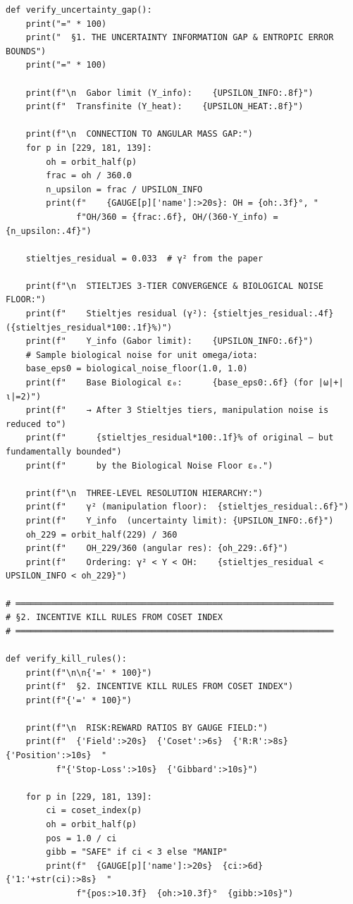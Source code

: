 \begin{verbatim}
def verify_uncertainty_gap():
    print("=" * 100)
    print("  §1. THE UNCERTAINTY INFORMATION GAP & ENTROPIC ERROR BOUNDS")
    print("=" * 100)

    print(f"\n  Gabor limit (Υ_info):    {UPSILON_INFO:.8f}")
    print(f"  Transfinite (Υ_heat):    {UPSILON_HEAT:.8f}")

    print(f"\n  CONNECTION TO ANGULAR MASS GAP:")
    for p in [229, 181, 139]:
        oh = orbit_half(p)
        frac = oh / 360.0
        n_upsilon = frac / UPSILON_INFO
        print(f"    {GAUGE[p]['name']:>20s}: OH = {oh:.3f}°, "
              f"OH/360 = {frac:.6f}, OH/(360·Υ_info) = {n_upsilon:.4f}")
    
    stieltjes_residual = 0.033  # γ² from the paper

    print(f"\n  STIELTJES 3-TIER CONVERGENCE & BIOLOGICAL NOISE FLOOR:")
    print(f"    Stieltjes residual (γ²): {stieltjes_residual:.4f} ({stieltjes_residual*100:.1f}%)")
    print(f"    Υ_info (Gabor limit):    {UPSILON_INFO:.6f}")
    # Sample biological noise for unit omega/iota:
    base_eps0 = biological_noise_floor(1.0, 1.0)
    print(f"    Base Biological ε₀:      {base_eps0:.6f} (for |ω|+|ι|=2)")
    print(f"    → After 3 Stieltjes tiers, manipulation noise is reduced to")
    print(f"      {stieltjes_residual*100:.1f}% of original — but fundamentally bounded")
    print(f"      by the Biological Noise Floor ε₀.")

    print(f"\n  THREE-LEVEL RESOLUTION HIERARCHY:")
    print(f"    γ² (manipulation floor):  {stieltjes_residual:.6f}")
    print(f"    Υ_info  (uncertainty limit): {UPSILON_INFO:.6f}")
    oh_229 = orbit_half(229) / 360
    print(f"    OH_229/360 (angular res): {oh_229:.6f}")
    print(f"    Ordering: γ² < Υ < OH:    {stieltjes_residual < UPSILON_INFO < oh_229}")

# ═══════════════════════════════════════════════════════════════
# §2. INCENTIVE KILL RULES FROM COSET INDEX
# ═══════════════════════════════════════════════════════════════

def verify_kill_rules():
    print(f"\n\n{'=' * 100}")
    print(f"  §2. INCENTIVE KILL RULES FROM COSET INDEX")
    print(f"{'=' * 100}")

    print(f"\n  RISK:REWARD RATIOS BY GAUGE FIELD:")
    print(f"  {'Field':>20s}  {'Coset':>6s}  {'R:R':>8s}  {'Position':>10s}  "
          f"{'Stop-Loss':>10s}  {'Gibbard':>10s}")
    
    for p in [229, 181, 139]:
        ci = coset_index(p)
        oh = orbit_half(p)
        pos = 1.0 / ci
        gibb = "SAFE" if ci < 3 else "MANIP"
        print(f"  {GAUGE[p]['name']:>20s}  {ci:>6d}  {'1:'+str(ci):>8s}  "
              f"{pos:>10.3f}  {oh:>10.3f}°  {gibb:>10s}")


\end{verbatim}
